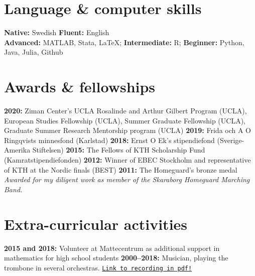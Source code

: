 \documentclass[letterpaper,10pt]{article}
\newcommand{\bold}[1]{\ifhmode\hspace{6pt}\fi\textbf{#1:}}
\begin{document}
\section*{Language \& computer skills}
\bold{Native} Swedish \bold{Fluent} English \\
\bold{Advanced} MATLAB, Stata, \LaTeX; \bold{Intermediate} R; \bold{Beginner} Python, Java, Julia, Github

\section*{Awards \& fellowships}
\bold{2020} Ziman Center’s UCLA Rosalinde and Arthur Gilbert Program (UCLA), European Studies Fellowship (UCLA), Summer Graduate Fellowship (UCLA), Graduate Summer Research Mentorship program (UCLA) \bold{2019} Frida och A O Ringqvists minnesfond (Karlstad) \bold{2018} Ernst O Ek's stipendiefond (Sverige-Amerika Stiftelsen) \bold{2015}
The Fellows of KTH Scholarship Fund (Kamratstipendiefonden) \bold{2012} Winner of EBEC Stockholm and representative of KTH at the Nordic finals (BEST) \bold{2011} The Homeguard's bronze medal \emph{Awarded for my diligent work as member of the Skaraborg Homeguard Marching Band.}

\section*{Extra-curricular activities} 
\bold{2015 and 2018} Volunteer at Mattecentrum as additional support in mathematics for high school students \bold{2000--2018} Musician, playing the trombone in several orchestras. \href{https://www.youtube.com/watch?v=nn6dDYi3AFg}{\texttt{Link to recording in pdf!}}
\iffalse
\iffalse
\emph{Several elected positions} in my division of KTH Student association, including:
\begin{lista2}
\emph{Treasurer} for a committee, \\
\emph{Producer} (head) for a play involving 100 people.  \bold{2011--2015}
\end{lista2}
\fi
\emph{Musician}, playing the trombone in several orchestras.%
\bold{2000--2018}

\fi
\end{document}
